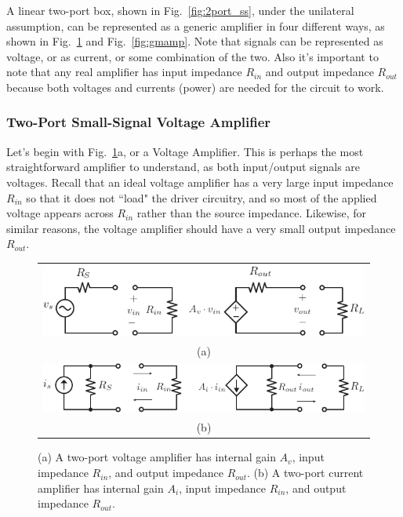  
A linear two-port box, shown in Fig.~\ref{fig:2port_ss}, under the unilateral assumption, can be represented as a generic amplifier in four different ways, as shown in Fig.~\ref{fig:vi_amp} and Fig.~\ref{fig:gmamp}.  Note that signals can be represented as voltage, or as current, or some combination of the two.  Also it's important to note that any real amplifier has input impedance $R_{in}$ and output impedance $R_{out}$ because both voltages and currents (power) are needed for the circuit to work.  

\subsubsection{Two-Port Small-Signal Voltage Amplifier}


Let's begin with Fig.~\ref{fig:vi_amp}a, or a Voltage Amplifier.  This is perhaps the most straightforward amplifier to understand, as both input/output signals are voltages.  Recall that an ideal voltage amplifier has a very large input impedance $R_{in}$ so that it does not ``load" the driver circuitry, and so most of the applied voltage appears across $R_{in}$ rather than the source impedance.  Likewise, for similar reasons, the voltage amplifier should have a very small output impedance $R_{out}$.

\begin{figure}[tb]
\begin{center}
\begin{tabular}{c}
\includegraphics[width=.7\columnwidth]{vamp_label} \\
(a) \\
\includegraphics[width=.7\columnwidth]{iamp} \\
(b) \\
\end{tabular}
\end{center}
\caption{(a) A two-port voltage amplifier has internal gain $A_v$, input impedance $R_{in}$, and output impedance $R_{out}$.  (b) A two-port current amplifier has internal gain $A_i$, input impedance $R_{in}$, and output impedance $R_{out}$.} \label{fig:vi_amp}
\end{figure}

